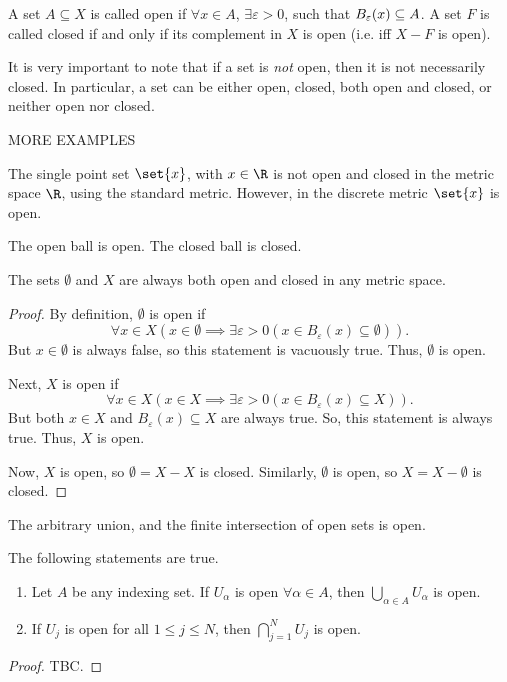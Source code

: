 \begin{ndfn}
  A set $A \subseteq X$ is called open if $\forall x \in A$, $\exists \varepsilon > 0$, such that $B_{\varepsilon}(x) \subseteq A$. A set $F$ is called closed if and only if its complement in $X$ is open (i.e. iff $X-F$ is open).
\end{ndfn}
It is very important to note that if a set is \emph{not} open, then it is not necessarily closed. In particular, a set can be either open, closed, both open and closed, or neither open nor closed.

MORE EXAMPLES

\begin{negg}
  The single point set $\set{x}$, with $x\in\R$ is not open and closed in the metric space $\R$, using the standard metric. However, in the discrete metric $\set{x}$ is open.
\end{negg}

\begin{nlemma}
  The open ball is open. The closed ball is closed.
\end{nlemma}

\begin{nthm}
  The sets $\emptyset$ and $X$ are always both open and closed in any metric space.
\end{nthm}
\begin{proof}
  By definition, $\emptyset$ is open if
  \begin{equation*}
    \forall x \in X \left(x \in \emptyset \implies \exists\varepsilon>0 (x \in B_{\varepsilon}(x) \subseteq \emptyset)\right).
  \end{equation*}
  But $x \in \emptyset$ is always false, so this statement is vacuously true. Thus, $\emptyset$ is open.

  Next, $X$ is open if
  \begin{equation*}
    \forall x \in X \left(x \in X \implies \exists\varepsilon>0 (x \in B_{\varepsilon}(x) \subseteq X)\right).
  \end{equation*}
  But both $x \in X$ and $B_{\varepsilon}(x) \subseteq X$ are always true. So, this statement is always true. Thus, $X$ is open.

  Now, $X$ is open, so $\emptyset = X-X$ is closed. Similarly, $\emptyset$ is open, so $X = X-\emptyset$ is closed.
\end{proof}

The arbitrary union, and the finite intersection of open sets is open.
\begin{nthm}
  The following statements are true.
  \begin{enumerate}
  \item Let $A$ be any indexing set. If $U_{\alpha}$ is open $\forall\alpha\in A$, then $\bigcup_{\alpha\in A} U_{\alpha}$ is open.
  \item If $U_{j}$ is open for all $1 \leq j \leq N$, then $\bigcap_{j=1}^{N} U_{j}$ is open.
  \end{enumerate}
\end{nthm}
\begin{proof}
  TBC.
\end{proof}

